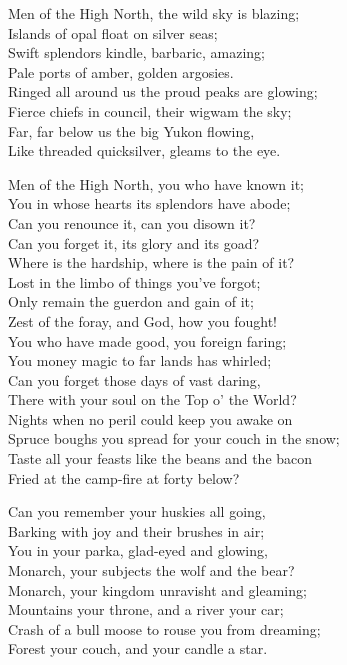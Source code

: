 
\begin{poemblock}
Men of the High North, the wild sky is blazing;\\
\idt Islands of opal float on silver seas;\\
Swift splendors kindle, barbaric, amazing;\\
\idt Pale ports of amber, golden argosies.\\
Ringed all around us the proud peaks are glowing;\\
\idt Fierce chiefs in council, their wigwam the sky;\\
Far, far below us the big Yukon flowing,\\
\idt Like threaded quicksilver, gleams to the eye.

Men of the High North, you who have known it;\\
\idt You in whose hearts its splendors have abode;\\
Can you renounce it, can you disown it?\\
\idt Can you forget it, its glory and its goad?\\
Where is the hardship, where is the pain of it?\\
\idt Lost in the limbo of things you've forgot;\\
Only remain the guerdon and gain of it;\\
\idt Zest of the foray, and God, how you fought!\\

You who have made good, you foreign faring;\\
\idt You money magic to far lands has whirled;\\
Can you forget those days of vast daring,\\
\idt There with your soul on the Top o' the World?\\
Nights when no peril could keep you awake on\\
\idt Spruce boughs you spread for your couch in the snow;\\
Taste all your feasts like the beans and the bacon\\
\idt Fried at the camp-fire at forty below?

Can you remember your huskies all going,\\
\idt Barking with joy and their brushes in air;\\
You in your parka, glad-eyed and glowing,\\
\idt Monarch, your subjects the wolf and the bear?\\
Monarch, your kingdom unravisht and gleaming;\\
\idt Mountains your throne, and a river your car;\\
Crash of a bull moose to rouse you from dreaming;\\
\idt Forest your couch, and your candle a star.


\end{poemblock}
